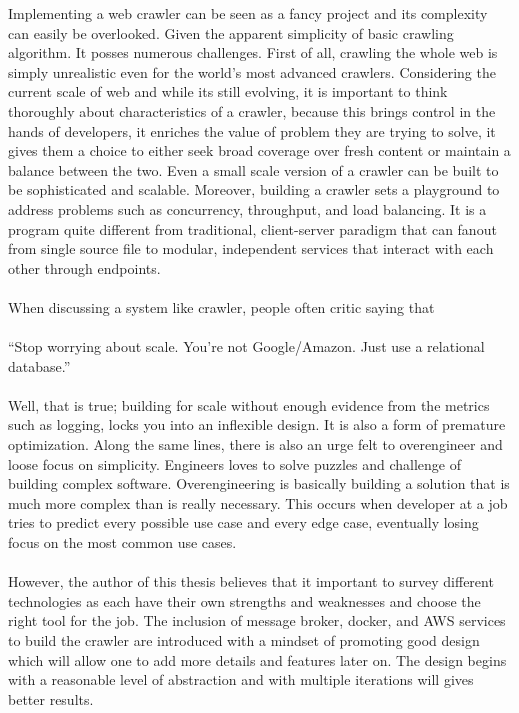 Implementing a web crawler can be seen as a fancy project and its complexity can easily be overlooked.
Given the apparent simplicity of basic crawling algorithm. It posses numerous challenges. First of all,
crawling the whole web is simply unrealistic even for the world's most advanced crawlers. Considering the
current scale of web and while its still evolving, it is important to think thoroughly about
characteristics of a crawler, because this brings control in the hands of developers, it enriches the
value of problem they are trying to solve, it gives them a choice to either seek broad coverage over fresh
content or maintain a balance between the two. Even a small scale version of a crawler can be built to
be sophisticated and scalable. Moreover, building a crawler sets a playground to address problems such
as concurrency, throughput, and load balancing. It is a program quite different from traditional,
client-server paradigm that can fanout from single source file to modular, independent services that interact with each other through endpoints. 
\\
\\
When discussing a system like crawler, people often critic saying that
\\
\\
``Stop worrying about scale. You're not Google/Amazon. Just use a relational database.''
\\
\\
Well, that is true; building for scale without enough evidence from the metrics such as logging, locks you into an inflexible design. It is also a form
of premature optimization. Along the same lines, there is also an urge felt to overengineer and loose
focus on simplicity. Engineers loves to solve puzzles and challenge of building complex software. Overengineering is basically building a solution that is much more complex than is really necessary. This occurs when developer at a job tries to predict every possible use case and every edge case, eventually losing focus on the most common use cases.  
\\
\\
However, the author of this thesis believes that it important to survey different technologies as each have
their own strengths and weaknesses and choose the right tool for the job. The inclusion of message broker, docker, and AWS services to build the crawler are introduced with a mindset of promoting good design which will allow one to add more details and features later on. The design begins with a reasonable level of abstraction and with multiple iterations will gives better results.


